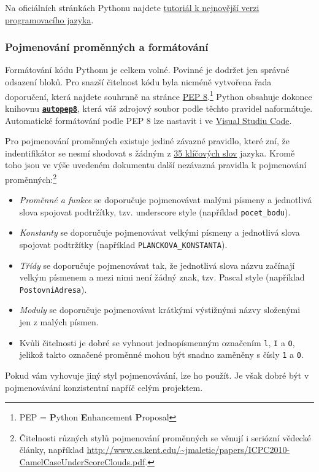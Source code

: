\documentclass[a4paper,11pt,twoside]{article}
\def\code#1{\textnormal{\texttt{#1}}}
\def\file#1{\textnormal{\textbf{\texttt{#1}}}}
\def\abbreviation#1{\textnormal{\textsc{#1}}}
\theoremstyle{red}
\theoremstyle{green}
\begin{document}
    Na oficiálních stránkách Pythonu najdete \href{https://docs.python.org/3/tutorial/}{tutoriál k nejnovější verzi programovacího jazyka}.

\subsubsection{Pojmenování proměnných a formátování}
    Formátování kódu Pythonu je celkem volné.
    Povinné je dodržet jen správné odsazení bloků.
    Pro snazší čitelnost kódu byla nicméně vytvořena řada doporučení, která najdete souhrnně na stránce \href{https://www.python.org/dev/peps/pep-0008}{PEP 8}.\footnote{\abbreviation{PEP} = {\bf P}ython {\bf E}nhancement {\bf P}roposal}
    Python obsahuje dokonce knihovnu \file{\href{https://pypi.org/project/autopep8/}{autopep8}}, která váš zdrojový soubor podle těchto pravidel naformátuje.
    Automatické formátování podle PEP 8 lze nastavit i ve \href{https://code.visualstudio.com/docs/python/editing#_formatting}{Visual Studiu Code}.
        
    Pro pojmenování proměnných existuje jediné závazné pravidlo, které zní, že indentifikátor se nesmí shodovat s žádným z \href{https://docs.python.org/3/reference/lexical_analysis.html#keywords}{35 klíčových slov} jazyka.
    Kromě toho jsou ve výše uvedeném dokumentu další nezávazná pravidla k pojmenování proměnných:\footnote{
        Čitelnosti různých stylů pojmenování proměnných se věnují i seriózní vědecké články, například
        \url{http://www.cs.kent.edu/~jmaletic/papers/ICPC2010-CamelCaseUnderScoreClouds.pdf}.
    }
    \begin{itemize}
        \item
            \emph{Proměnné a funkce} se doporučuje pojmenovávat malými písmeny a jednotlivá slova spojovat podtržítky, tzv. underscore style (například \code{pocet\_bodu}).
        \item
            \emph{Konstanty} se doporučuje pojmenovávat velkými písmeny a jednotlivá slova spojovat podtržítky (například \code{PLANCKOVA\_KONSTANTA}).
        \item
            \emph{Třídy} se doporučuje pojmenovávat tak, že jednotlivá slova názvu začínají velkým písmenem a mezi nimi není žádný znak, tzv. Pascal style (například \code{PostovniAdresa}).
        \item
            \emph{Moduly} se doporučuje pojmenovávat krátkými výstižnými názvy složenými jen z malých písmen.
        \item
            Kvůli čitelnosti je dobré se vyhnout jednopísmenným označením \code{l}, \code{I} a \code{O}, jelikož takto označené proměnné mohou být snadno zaměněny s čísly \code{1} a \code{0}.

    \end{itemize}
    Pokud vám vyhovuje jiný styl pojmenovávání, lze ho použít.
    Je však dobré být v pojmenovávání konzistentní napříč celým projektem.
\end{document}
